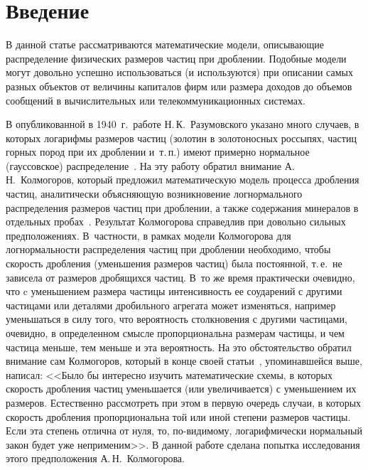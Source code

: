       \begin{multicols}{2}

      \label{st\stat}

\section{Введение}

В данной статье рассматриваются математические модели, описывающие
распределение физических размеров частиц при дроблении. Подобные
модели могут довольно успешно использоваться (и используются) при
описании самых разных объектов от величины капиталов фирм или
размера доходов до объемов сообщений в вычислительных или
телекоммуникационных системах.

В опубликованной в 1940~г.\ работе Н.\,К.~Разумовского указано много
случаев, в которых логарифмы размеров частиц (золотин в
золотоносных россыпях, частиц горных пород при их дроблении и~т.\,п.)
имеют примерно нормальное (гауссовское)\linebreak
распределение~\cite{1kk}. На
эту работу обратил внимание А.\,Н.~Колмогоров, который предложил
матема\-тическую модель процесса дробления частиц,\linebreak
аналитически
объясняющую возникновение лог\-нормального распределения размеров
частиц при\linebreak
 дроблении, а также содержания минералов в отдельных
пробах~\cite{2kk}. Результат Колмогорова справедлив при довольно сильных
предположениях.
%
В~част\-ности, в рамках модели Колмогорова для
лог\-нормальности распределения час\-тиц при дроб\-ле\-нии необходимо,
чтобы скорость дроб\-ле\-ния (уменьшения размеров час\-тиц) была
постоянной, т.\,е.\ не зависела от размеров дробящихся час\-тиц.
В~то же время практически очевидно, что c уменьшением размера
час\-ти\-цы интенсивность ее соударений с другими час\-ти\-ца\-ми или
деталями дробильного агрегата может изменяться, например\linebreak
уменьшаться в силу того, что вероятность столкновения с другими
частицами, очевидно, в определенном смысле пропорциональна
размерам частицы, и чем частица меньше, тем меньше и эта
вероятность. На это обстоятельство обратил внимание сам
Колмогоров, который в конце своей статьи~\cite{2kk}, упоминавшейся выше,
написал: <<Было бы интересно изучить математические схемы, в
которых скорость дробления частиц уменьшается (или увеличивается)
с уменьшением их размеров. Естественно рассмотреть при этом в
первую очередь случаи, в которых скорость дроб\-ле\-ния
пропорциональна той или иной степени размеров частицы. Если эта
степень отлична от нуля, то, по-видимому, логариф\-ми\-чески
нормальный закон будет уже неприменим>>. В данной работе сделана
попытка исследования этого предположения А.\,Н.~Колмогорова.


\end{multicols}
